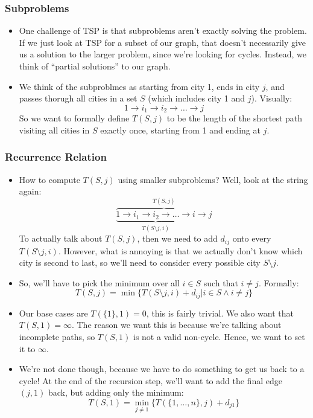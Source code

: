 \subsubsection{Subproblems}
\begin{itemize}
	\item One challenge of TSP is that subproblems aren't exactly solving the problem. If we just look at 
		TSP for a subset of our graph, that doesn't necessarily give us a solution to the larger problem, since 
		we're looking for cycles. Instead, we think of ``partial solutions'' to our graph. 
	\item We think of the subproblmes as starting from city 1, ends in city $j$, and passes thorugh all cities
		in a set $S$ (which includes city 1 and \( j \)). Visually:
		\[
			1 \to i_1 \to i_2 \to \dots \to j			
		\]
		So we want to formally define $T(S, j)$ to be the length of the shortest path visiting 
		all cities in $S$ exactly once, starting from 1 and ending at $j$. 
\end{itemize}
\subsubsection{Recurrence Relation}
\begin{itemize}
	\item How to compute $T(S, j)$ using smaller subproblems? Well, look at the string again:
		\[
			\overbrace{\underbrace{1 \to i_1 \to i_2 \to \dots \to i}_{T(S \setminus j, i)} \to j}^{T(S, j)}
		\]
		To actually talk about $T(S, j)$, then we need to add $d_{ij}$ onto every $T(S \setminus j, i)$. However,
		what is annoying is that we actually don't know which city is second to last, so we'll need 
		to consider every possible city $S \setminus j$. 
	\item So, we'll have to pick the minimum over all $i \in S$ such that $i \neq j$. Formally:
		\[
			T(S, j) = \min \{T(S \setminus j, i) + d_{ij} | i \in S \land i \neq  j\} 
		\]
	\item Our base cases are $T(\{1\} , 1) = 0$, this is fairly trivial. We also want that $T(S, 1) = \infty$.
		The reason we want this is because we're talking about incomplete paths, so $T(S, 1)$ is not 
		a valid non-cycle. Hence, we want to set it to $\infty$.  
	\item We're not done though, because we have to do something to get us back to a cycle! At the end of 
		the recursion step, we'll want to add the final edge $(j, 1)$ back, but adding only the minimum:
		\[
			T(S, 1) = \min_{j \neq  1}\{T(\{1, \dots, n\}, j) + d_{j 1}\}
		\] 
\end{itemize}
